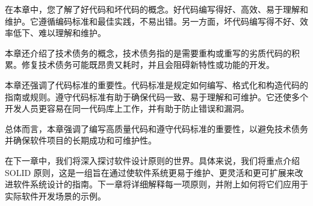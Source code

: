 在本章中，您了解了好代码和坏代码的概念。好代码编写得好、高效、易于理解和维护。它遵循编码标准和最佳实践，不易出错。另一方面，坏代码编写得不好、效率低下、难以理解和维护。

本章还介绍了技术债务的概念，技术债务指的是需要重构或重写的劣质代码的积累。修复技术债务可能既昂贵又耗时，并且会阻碍新特性或功能的开发。

本章还强调了代码标准的重要性。代码标准是规定如何编写、格式化和构造代码的指南或规则。遵守代码标准有助于确保代码一致、易于理解和可维护。它还使多个开发人员更容易在同一代码库上工作，并有助于防止错误和漏洞。

总体而言，本章强调了编写高质量代码和遵守代码标准的重要性，以避免技术债务并确保软件项目的长期成功和可维护性。

在下一章中，我们将深入探讨软件设计原则的世界。具体来说，我们将重点介绍 SOLID 原则，这是一组旨在通过使软件系统更易于维护、更灵活和更可扩展来改进软件系统设计的指南。下一章将详细解释每一项原则，并附上如何将它们应用于实际软件开发场景的示例。
